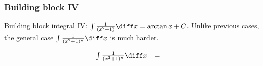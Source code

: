 
\begin{frame}
\frametitle{Building block IV}
Building block integral IV: $\int \frac{1}{(x^2+1)}\diff x=\arctan x+C$. Unlike previous cases, the general case $\int \frac{1}{(x^2+1)^n}\diff x$ is much harder.

\begin{example}
\[
\begin{array}{rcl}
\int \frac{1}{(x^2+1)^n}\diff x&=&
\end{array}
\]

\end{example}

\end{frame}

